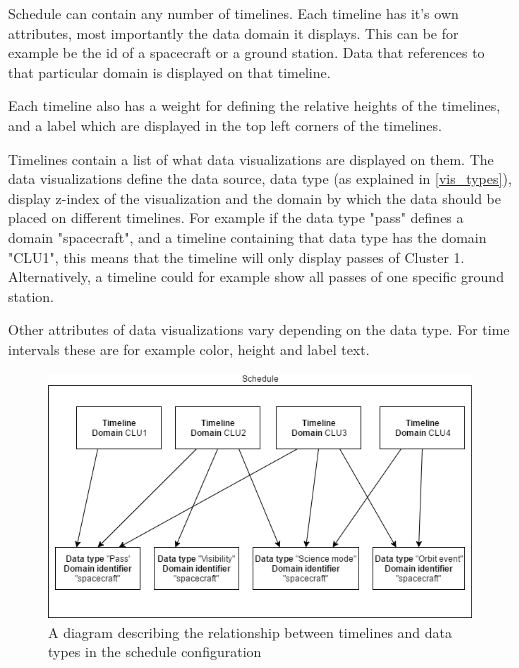 Schedule can contain any number of timelines. Each timeline has it's own attributes, most importantly the data domain it displays. This can be for example be the id of a spacecraft or a ground station. Data that references to that particular domain is displayed on that timeline. 

Each timeline also has a weight for defining the relative heights of the timelines, and a label which are displayed in the top left corners of the timelines.

Timelines contain a list of what data visualizations are displayed on them. The data visualizations define the data source, data type (as explained in \ref{vis_types}), display z-index of the visualization and the domain by which the data should be placed on different timelines. For example if the data type "pass" defines a domain "spacecraft", and a timeline containing that data type has the domain "CLU1", this means that the timeline will only display passes of Cluster 1. Alternatively, a timeline could for example show all passes of one specific ground station.

Other attributes of data visualizations vary depending on the data type. For time intervals these are for example color, height and label text.

\begin{figure}[ht]
  \begin{center}
    \includegraphics*[width=1\textwidth]{schedule_diagram}
  \end{center}
  \caption{A diagram describing the relationship between timelines and data types in the schedule configuration}
  \label{fig:schedule_diagram}
\end{figure}


